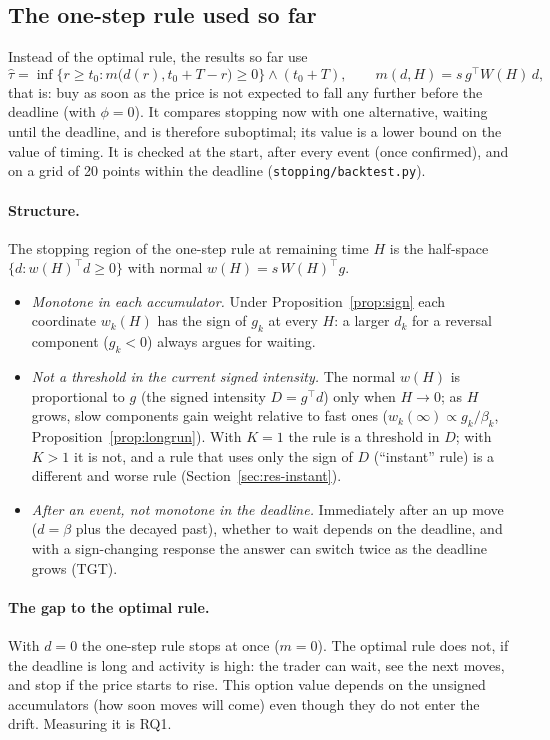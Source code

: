 \documentclass[11pt]{article}
\theoremstyle{definition}
\theoremstyle{remark}
\newcommand{\file}[1]{\texttt{#1}}
\begin{document}
\subsection{The one-step rule used so far}
\label{sec:onestep}

Instead of the optimal rule, the results so far use
\[
\hat\tau = \inf\big\{ r \ge t_0 : m\big(d(r), t_0 + T - r\big) \ge 0 \big\} \wedge (t_0 + T), \qquad m(d, H) = s\, g^\top W(H)\, d ,
\]
that is: buy as soon as the price is not expected to fall any further before the deadline (with $\phi = 0$). It compares stopping now with one alternative, waiting until the deadline, and is therefore suboptimal; its value is a lower bound on the value of timing. It is checked at the start, after every event (once confirmed), and on a grid of 20 points within the deadline (\file{stopping/backtest.py}).

\paragraph{Structure.} The stopping region of the one-step rule at remaining time $H$ is the half-space $\{d : w(H)^\top d \ge 0\}$ with normal $w(H) = s\, W(H)^\top g$.
\begin{itemize}
\item \emph{Monotone in each accumulator.} Under Proposition~\ref{prop:sign} each coordinate $w_k(H)$ has the sign of $g_k$ at every $H$: a larger $d_k$ for a reversal component ($g_k < 0$) always argues for waiting.
\item \emph{Not a threshold in the current signed intensity.} The normal $w(H)$ is proportional to $g$ (the signed intensity $D = g^\top d$) only when $H \to 0$; as $H$ grows, slow components gain weight relative to fast ones ($w_k(\infty) \propto g_k/\beta_k$, Proposition~\ref{prop:longrun}). With $K = 1$ the rule is a threshold in $D$; with $K > 1$ it is not, and a rule that uses only the sign of $D$ (``instant'' rule) is a different and worse rule (Section~\ref{sec:res-instant}).
\item \emph{After an event, not monotone in the deadline.} Immediately after an up move ($d = \beta$ plus the decayed past), whether to wait depends on the deadline, and with a sign-changing response the answer can switch twice as the deadline grows (TGT).
\end{itemize}

\paragraph{The gap to the optimal rule.} With $d = 0$ the one-step rule stops at once ($m = 0$). The optimal rule does not, if the deadline is long and activity is high: the trader can wait, see the next moves, and stop if the price starts to rise. This option value depends on the unsigned accumulators (how soon moves will come) even though they do not enter the drift. Measuring it is RQ1.
\end{document}
